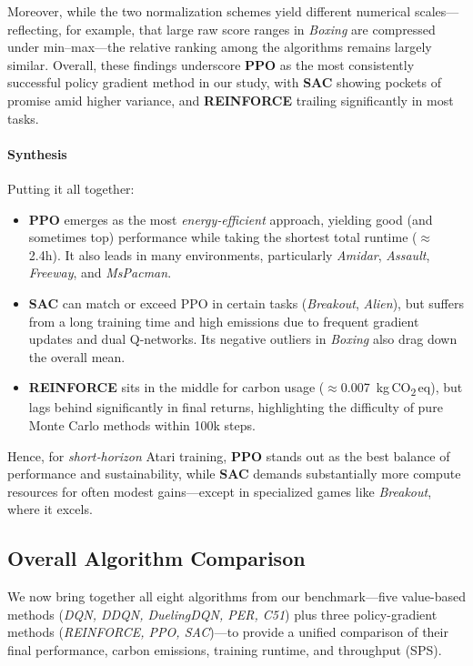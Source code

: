Moreover, while the two normalization schemes yield different numerical scales—reflecting, for example, that large raw score ranges in \emph{Boxing} are compressed under min--max—the relative ranking among the algorithms remains largely similar. Overall, these findings underscore \textbf{PPO} as the most consistently successful policy gradient method in our study, with \textbf{SAC} showing pockets of promise amid higher variance, and \textbf{REINFORCE} trailing significantly in most tasks.

\paragraph{Synthesis}
Putting it all together:
\begin{itemize}
	\item \textbf{PPO} emerges as the most \emph{energy‐efficient} approach, yielding good (and sometimes top) performance while taking the shortest total runtime ($\approx$2.4h). It also leads in many environments, particularly \emph{Amidar}, \emph{Assault}, \emph{Freeway}, and \emph{MsPacman}.
	\item \textbf{SAC} can match or exceed PPO in certain tasks (\emph{Breakout}, \emph{Alien}), but suffers from a long training time and high emissions due to frequent gradient updates and dual Q‐networks. Its negative outliers in \emph{Boxing} also drag down the overall mean.
	\item \textbf{REINFORCE} sits in the middle for carbon usage ($\approx$\num{0.007}~kg\,CO\textsubscript{2}\,eq), but lags behind significantly in final returns, highlighting the difficulty of pure Monte Carlo methods within 100k steps.
\end{itemize}
Hence, for \emph{short‐horizon} Atari training, \textbf{PPO} stands out as the best balance of performance and sustainability, while \textbf{SAC} demands substantially more compute resources for often modest gains—except in specialized games like \emph{Breakout}, where it excels. 

\subsection{Overall Algorithm Comparison}
\label{subsec:overall_algo_comparison}

We now bring together all eight algorithms from our benchmark—five value-based methods 
(\emph{DQN, DDQN, DuelingDQN, PER, C51}) plus three policy-gradient methods 
(\emph{REINFORCE, PPO, SAC})—to provide a unified comparison of their final performance, 
carbon emissions, training runtime, and throughput (SPS).

